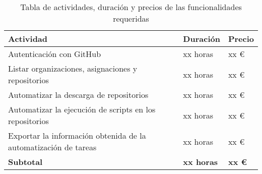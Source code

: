 \begin{table}[!ht]
\begin{center}
\begin{tabular}{|p{80mm}|p{25mm}|p{20mm}|} \hline 
\textbf{Actividad} & \textbf{Duración} & \textbf{Precio} \\ \hline

Autenticación con GitHub &
xx horas &
xx \euro{}
\\
\hline

Listar organizaciones, asignaciones y repositorios &
xx horas &
xx \euro{}
\\
\hline

Automatizar la descarga de repositorios &
xx horas &
xx \euro{}
\\
\hline

Automatizar la ejecución de scripts en los repositorios &
xx horas &
xx \euro{}
\\
\hline

Exportar la información obtenida de la automatización de tareas &
xx horas &
xx \euro{}
\\
\hline \hline

{\bfseries Subtotal} &
{\bfseries xx horas} &
{\bfseries xx \euro{}}
\\
\hline

\end{tabular}
\end{center}
\caption{Tabla de actividades, duración y precios de las funcionalidades requeridas}
\label{table:resOthers1}
\end{table}

